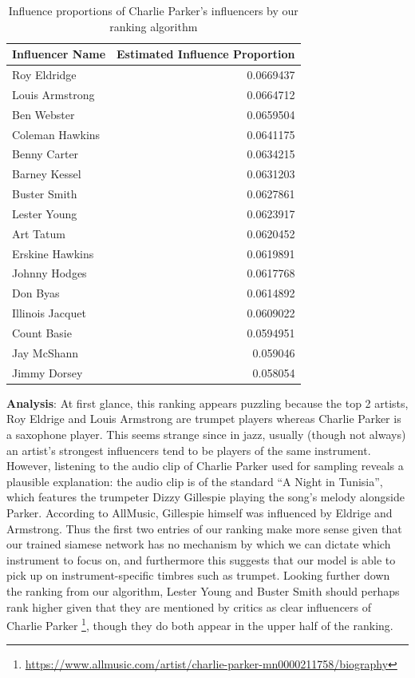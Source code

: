 \begin{table}[H]
\centering
\caption{Influence proportions of Charlie Parker's influencers by our ranking algorithm}
\begin{tabular}{lr}
\hline
 Influencer Name   &   Estimated Influence Proportion \\
\hline
 Roy Eldridge      &                        0.0669437 \\
 Louis Armstrong   &                        0.0664712 \\
 Ben Webster       &                        0.0659504 \\
 Coleman Hawkins   &                        0.0641175 \\
 Benny Carter      &                        0.0634215 \\
 Barney Kessel     &                        0.0631203 \\
 Buster Smith      &                        0.0627861 \\
 Lester Young      &                        0.0623917 \\
 Art Tatum         &                        0.0620452 \\
 Erskine Hawkins   &                        0.0619891 \\
 Johnny Hodges     &                        0.0617768 \\
 Don Byas          &                        0.0614892 \\
 Illinois Jacquet  &                        0.0609022 \\
 Count Basie       &                        0.0594951 \\
 Jay McShann       &                        0.059046  \\
 Jimmy Dorsey      &                        0.058054  \\
\hline
\end{tabular}
\end{table}

\textbf{Analysis}: At first glance, this ranking appears puzzling because the top 2 artists, Roy Eldrige and Louis Armstrong are trumpet players whereas Charlie Parker is a saxophone player. This seems strange since in jazz, usually (though not always) an artist's strongest influencers tend to be players of the same instrument. However, listening to the audio clip of Charlie Parker used for sampling reveals a plausible explanation: the audio clip is of the standard ``A Night in Tunisia'', which features the trumpeter Dizzy Gillespie playing the song's melody alongside Parker. According to AllMusic, Gillespie himself was influenced by Eldrige and Armstrong. Thus the first two entries of our ranking make more sense given that our trained siamese network has no mechanism by which we can dictate which instrument to focus on, and furthermore this suggests that our model is able to pick up on instrument-specific timbres such as trumpet. Looking further down the ranking from our algorithm, Lester Young and Buster Smith should perhaps rank higher given that they are mentioned by critics as clear influencers of Charlie Parker \footnote{\url{https://www.allmusic.com/artist/charlie-parker-mn0000211758/biography}}, though they do both appear in the upper half of the ranking.

